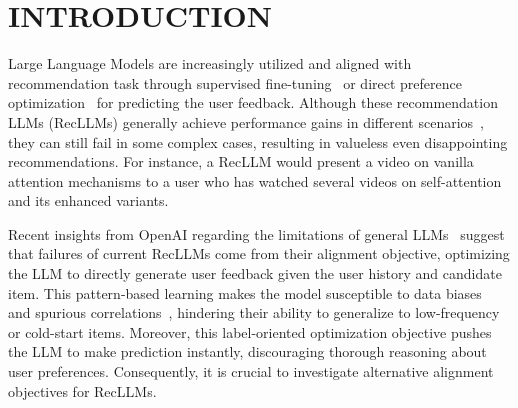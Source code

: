 \section{INTRODUCTION}

%
%
%
%
%
Large Language Models are increasingly utilized and aligned with recommendation task through supervised fine-tuning~\cite{TallRec,Binllm,bigRec} or direct preference optimization~\cite{SDPO} for predicting the user feedback. Although these recommendation LLMs (RecLLMs) generally achieve performance gains in different scenarios~\cite{DBLP:journals/www/WuZQWGSQZZLXC24, DBLP:conf/www/WangTHYLZZPW24, DBLP:journals/corr/abs-2410-19744}, they can still fail in some complex cases, resulting in valueless even disappointing recommendations. For instance, a RecLLM would present a video on vanilla attention mechanisms to a user who has watched several videos on self-attention and its enhanced variants. 

Recent insights from OpenAI regarding the limitations of general LLMs~\cite{deliberative_alignment} suggest that failures of current RecLLMs come from their alignment objective, \ie optimizing the LLM to directly generate user feedback given the user history and candidate item. This pattern-based learning makes the model susceptible to data biases~\cite{DecodingMatters} and spurious correlations~\cite{yangzhang23,Xiangnan23}, hindering their ability to generalize to low-frequency or cold-start items. Moreover, this label-oriented optimization objective pushes the LLM to make prediction instantly, discouraging thorough reasoning about user preferences. Consequently, it is crucial to investigate alternative alignment objectives for RecLLMs.

